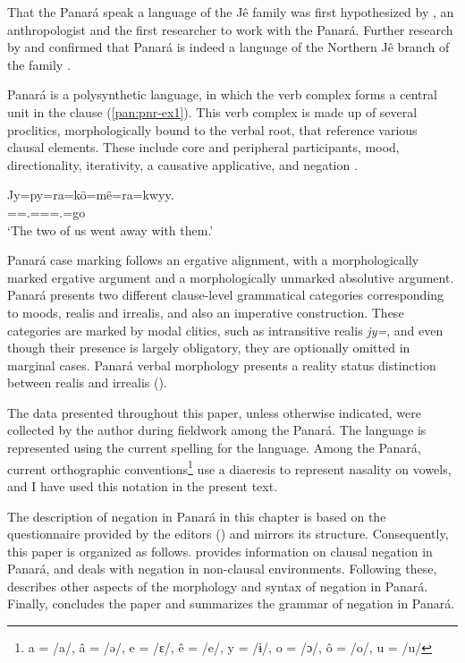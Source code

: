 \documentclass[output=paper,colorlinks,citecolor=brown,draft]{langscibook}
\begin{document}
That the Panará speak a language of the Jê family was first hypothesized by \citet{Heelas1979}, an anthropologist and the first researcher to work with the Panará. Further research by \citet{Schwartzman1988} and \citet{Dourado-Rodrigues1993} confirmed that Panará is indeed a language of the Northern Jê branch of the family \citep{Rodrigues1999}.

Panará is a polysynthetic language, in which the verb complex forms a central unit in the clause (\ref{pan:pnr-ex1}). This verb complex is made up of several proclitics, morphologically bound to the verbal root, that reference various clausal elements. These include core and peripheral participants, mood, directionality, iterativity, a causative applicative, and negation \citep{Bardagil2018}.

\ea\label{pan:pnr-ex1}
    \gll Jy=py=ra=kö=më=ra=kwyy. \\
        \Intr{}=\Iter{}=\Tpl.\Abs{}=\Com{}=\Du{}=\Fsg.\Abs{}=go \\
    \glt `The two of us went away with them.' \\
\z 

Panará case marking follows an ergative alignment, with a morphologically marked ergative argument and a morphologically unmarked absolutive argument. Panará presents two different clause-level grammatical categories corresponding to moods, realis and irrealis, and also an imperative construction. These categories are marked by modal clitics, such as intransitive realis \textit{jy=}, and even though their presence is largely obligatory, they are optionally omitted in mar\-gin\-al cases.
Panará verbal morphology presents a reality status distinction between realis and irrealis (\citealt{Dourado2001,Bardagil2015,Bardagil2018}).

The data presented throughout this paper, unless otherwise indicated, were collected by the author during fieldwork among the Panará. The language is represented using the current spelling for the language. Among the Panará, current orthographic conventions\footnote{a = /a/, â = /ə/, e = /ɛ/, ê = /e/, y = /ɨ/, o = /ɔ/, ô = /o/, u = /u/} use a diaeresis to represent nasality on vowels, and I have used this notation in the present text. 

The description of negation in Panará in this chapter is based on the questionnaire provided by the editors () and mirrors its structure.
Consequently, this paper is organized as follows.  provides information on clausal negation in Panará, and  deals with negation in non-clausal environments. Following these,  describes other aspects of the morphology and syntax of negation in Panará. Finally,  concludes the paper and summarizes the grammar of negation in Panará.
\end{document}
